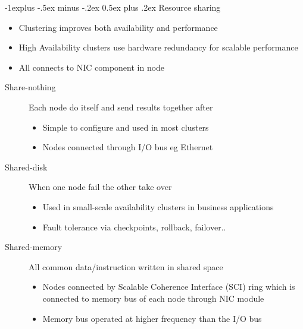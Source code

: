 \documentclass{article}
\makeatletter
\renewcommand{\subsection}{\@startsection{subsection}{2}{0mm}%
    {-1explus -.5ex minus -.2ex}%
    {0.5ex plus .2ex}%
{\normalfont\normalsize\bfseries}}
\makeatother
\begin{document}
\begin{multicols*}{3}
\subsection{Resource sharing}
\begin{itemize}
	\item Clustering improves both availability and performance
	\item High Availability clusters use hardware redundancy for scalable performance
	\item All connects to NIC component in node
\end{itemize}
\begin{description}
	\item[Share-nothing]{Each node do itself and send results together after}
	\begin{itemize}
		\item Simple to configure and used in most clusters
		\item Nodes connected through I/O bus eg Ethernet
	\end{itemize}
	\item[Shared-disk]{When one node fail the other take over}
	\begin{itemize}
		\item Used in small-scale availability clusters in business applications
		\item Fault tolerance via checkpoints, rollback, failover..
	\end{itemize}
	\item[Shared-memory]{All common data/instruction written in shared space}
	\begin{itemize}
		\item Nodes connected by Scalable Coherence Interface (SCI) ring which is connected to memory bus of each node through NIC module
		\item Memory bus operated at higher frequency than the I/O bus
	\end{itemize}
\end{description}

\end{multicols*}
\end{document}
